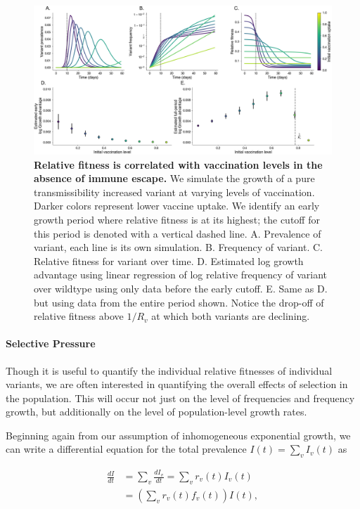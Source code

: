 \documentclass[12pt,oneside,letterpaper]{article}
\begin{document}
\begin{figure}[h]
    \centering
    \includegraphics[width=0.8\linewidth]{./figures/correlation_not_mechanism.png}
    \caption{\textbf{Relative fitness is correlated with vaccination levels in the absence of immune escape.}
    We simulate the growth of a pure transmissibility increased variant at varying levels of vaccination.
    Darker colors represent lower vaccine uptake.
    We identify an early growth period where relative fitness is at its highest; the cutoff for this period is denoted with a vertical dashed line.
        A. Prevalence of variant, each line is its own simulation.
        B. Frequency of variant.
        C. Relative fitness for variant over time.
        D. Estimated log growth advantage using linear regression of log relative frequency of variant over wildtype using only data before the early cutoff.
        E. Same as D. but using data from the entire period shown. Notice the drop-off of relative fitness above $1 / R_{v}$ at which both variants are declining.
    }
\label{fig:mechanism_identification}
\end{figure}

\paragraph{Selective Pressure}

Though it is useful to quantify the individual relative fitnesses of individual variants, we are often interested in quantifying the overall effects of selection in the population.
This will occur not just on the level of frequencies and frequency growth, but additionally on the level of population-level growth rates.

Beginning again from our assumption of inhomogeneous exponential growth, we can write a differential equation for the total prevalence $I(t)= \sum_{v} I_{v}(t)$ as

\begin{align*}
    \frac{d I}{d t} &= \sum_{v} \frac{d I_{v}}{d t} =  \sum_{v} r_{v}(t) I_{v}(t)\\ 
                    &= \left( \sum_{v} r_{v}(t) f_{v}(t) \right) I(t),
\end{align*}
\end{document}
